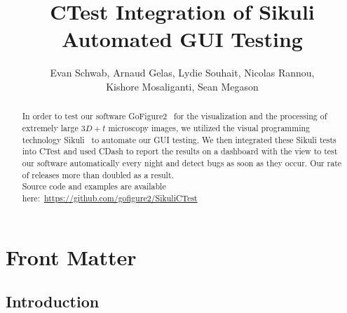 \documentclass{InsightArticle}
\title{CTest Integration of Sikuli Automated GUI Testing}
\author{Evan Schwab, Arnaud Gelas, Lydie Souhait, Nicolas Rannou,\\
Kishore Mosaliganti, Sean Megason}
\newcommand{\IJhandlerIDnumber}{3196}
\begin{document}
\IJhandlefooter{\IJhandlerIDnumber}


\ifpdf
\else
\fi

\maketitle

\ifhtml
\chapter*{Front Matter\label{front}}
\fi

\begin{abstract}
\noindent
In order to test our software GoFigure2~\cite{GoFigure2:Website} for the
visualization and the processing of extremely large $3D+t$ microscopy images,
we utilized the visual programming technology Sikuli~\cite{Sikuli:Website} to
automate our GUI testing. We then integrated these Sikuli tests into CTest and
used CDash to report the results on a dashboard with the view to test our
software automatically every night and detect bugs as soon as they occur.  Our
rate of releases more than doubled as a result.\\

\noindent Source code and examples are available
here:~\url{https://github.com/gofigure2/SikuliCTest}
\end{abstract}

\IJhandlenote{\IJhandlerIDnumber}

\tableofcontents
\section{Introduction}

\end{document}
